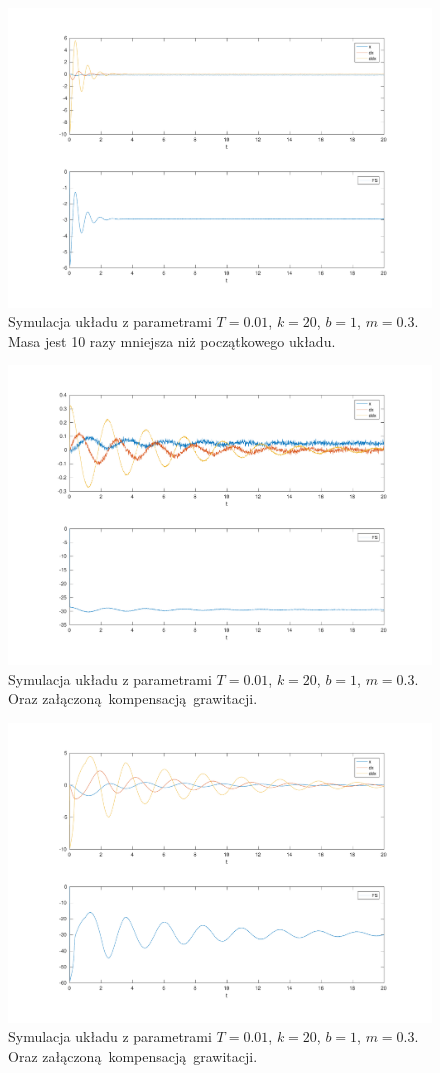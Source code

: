 \documentclass[a4paper, 10pt]{article}
\begin{document}
\begin{figure}[H]
	\includegraphics[width=0.99\linewidth]{system_wm_sys}
	\centering
	\caption{Symulacja układu z parametrami $T=0.01$, $k = 20$, $b = 1$, $m = 0.3$. Masa jest 10 razy mniejsza niż początkowego układu.}
	\label{fig:systemwm}
\end{figure}

\begin{figure}[H]
	\includegraphics[width=0.99\linewidth]{grav_ideal_sys}
	\centering
	\caption{Symulacja układu z parametrami $T=0.01$, $k = 20$, $b = 1$, $m = 0.3$. Oraz załączoną kompensacją grawitacji.}
	\label{fig:system_ideal}
\end{figure}

\begin{figure}[H]
	\includegraphics[width=0.99\linewidth]{grav_normal_sys}
	\centering
	\caption{Symulacja układu z parametrami $T=0.01$, $k = 20$, $b = 1$, $m = 0.3$. Oraz załączoną kompensacją grawitacji.}
	\label{fig:system_komp}
\end{figure}
\end{document}
